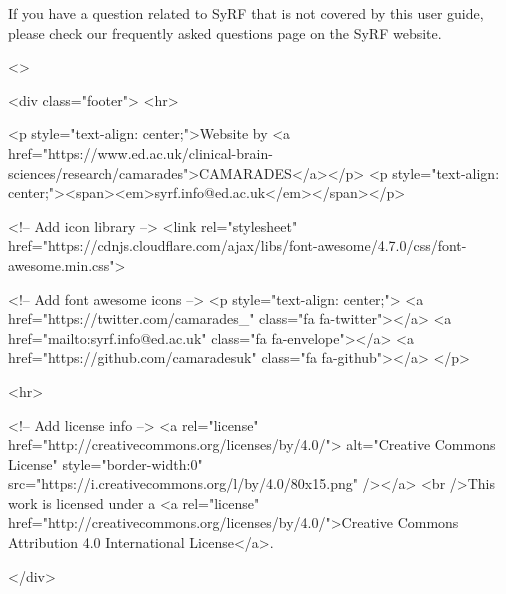 \documentclass[
]{book}
\begin{document}
If you have a question related to SyRF that is not covered by this user guide, please check our frequently asked questions page on the SyRF website.

\textless{}\textgreater{}

  

<div class="footer">
<hr>



<p style="text-align: center;">Website by <a href="https://www.ed.ac.uk/clinical-brain-sciences/research/camarades">CAMARADES</a></p>
<p style="text-align: center;"><span><em>syrf.info@ed.ac.uk</em></span></p>




<!-- Add icon library -->
<link rel="stylesheet" href="https://cdnjs.cloudflare.com/ajax/libs/font-awesome/4.7.0/css/font-awesome.min.css">



<!-- Add font awesome icons -->
<p style="text-align: center;">
<a href="https://twitter.com/camarades_" class="fa fa-twitter"></a>
<a href="mailto:syrf.info@ed.ac.uk" class="fa fa-envelope"></a>
<a href="https://github.com/camaradesuk" class="fa fa-github"></a>
</p>



<hr>



<!-- Add license info -->
<a rel="license" href="http://creativecommons.org/licenses/by/4.0/"> alt="Creative Commons License" style="border-width:0" src="https://i.creativecommons.org/l/by/4.0/80x15.png" /></a>
<br />This work is licensed under a <a rel="license" href="http://creativecommons.org/licenses/by/4.0/">Creative Commons Attribution 4.0 International License</a>.




</div>
\end{document}

